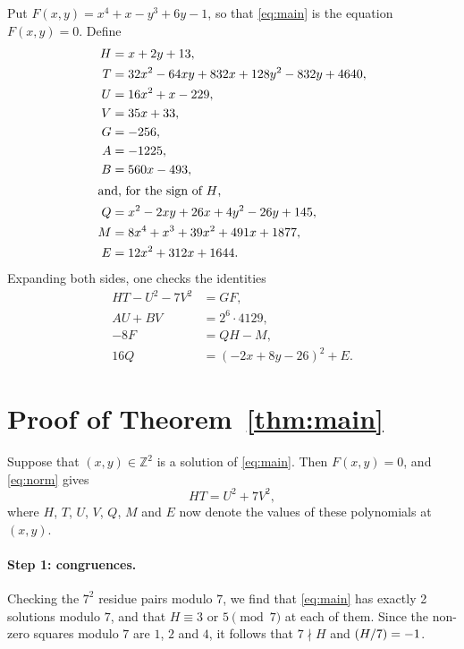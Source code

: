 \documentclass[11pt]{article}
\newcommand{\Z}{\mathbb{Z}}
\newcommand{\leg}[2]{\mathchoice{\biggl(\dfrac{#1}{#2}\biggr)}{(#1/#2)}{(#1/#2)}{(#1/#2)}}
\begin{document}
Put $F(x,y)=x^{4}+x-y^{3}+6y-1$, so that \eqref{eq:main} is the equation $F(x,y)=0$. Define
\begin{align*}
H&=x+2y+13,\\
T&=32x^{2}-64xy+832x+128y^{2}-832y+4640,\\
U&=16x^{2}+x-229,\\
V&=35x+33,\\
G&=-256,\\
A&=-1225,\\
B&=560x-493,\\
\intertext{and, for the sign of $H$,}
Q&=x^{2}-2xy+26x+4y^{2}-26y+145,\\
M&=8x^{4}+x^{3}+39x^{2}+491x+1877,\\
E&=12x^{2}+312x+1644.
\end{align*}
Expanding both sides, one checks the identities
\begin{align}
HT-U^2-7V^2&=GF,\label{eq:norm}\\
AU+BV&=2^{6}\cdot 4129,\label{eq:bezout}\\
-8F&=QH-M,\label{eq:sign}\\
16Q&=(-2x+8y-26)^2+E.\label{eq:sign2}
\end{align}

\section{Proof of Theorem~\ref{thm:main}}

Suppose that $(x,y)\in\Z^2$ is a solution of \eqref{eq:main}. Then $F(x,y)=0$, and \eqref{eq:norm} gives
\begin{equation}\label{eq:HT}
HT=U^2+7V^2,
\end{equation}
where $H$, $T$, $U$, $V$, $Q$, $M$ and $E$ now denote the values of these polynomials at $(x,y)$.

\paragraph{Step 1: congruences.} Checking the $7^2$ residue pairs modulo $7$, we find that \eqref{eq:main} has exactly 2 solutions modulo $7$, and that $H\equiv3\text{ or }5\pmod{7}$ at each of them. Since the non-zero squares modulo $7$ are $1$, $2$ and $4$, it follows that $7\nmid H$ and $\leg{H}{7}=-1$.
\end{document}
